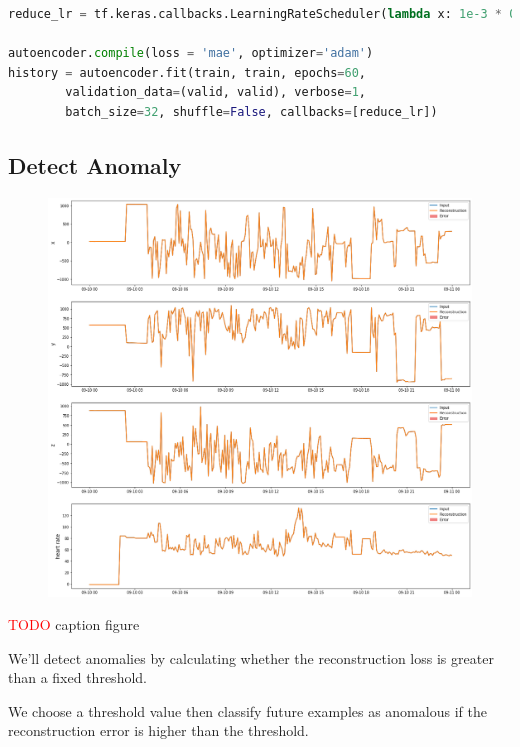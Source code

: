 \begin{lstlisting}[language=Python]
reduce_lr = tf.keras.callbacks.LearningRateScheduler(lambda x: 1e-3 * 0.90 ** x)

autoencoder.compile(loss = 'mae', optimizer='adam')
history = autoencoder.fit(train, train, epochs=60, 
		validation_data=(valid, valid), verbose=1, 
		batch_size=32, shuffle=False, callbacks=[reduce_lr])
\end{lstlisting}

\subsection*{Detect Anomaly}\label{Detect Anomaly}

\begin{figure}[H]
\centering
  \includegraphics[scale=0.35]{img/task_2/reconstructions_train.png}
  \caption{}
  \label{fig: }
\end{figure}

\textcolor{red}{TODO} caption figure

We'll detect anomalies by calculating whether the reconstruction loss is greater than a fixed threshold.

We choose a threshold value then classify future examples as anomalous if the reconstruction error is higher than the threshold.

